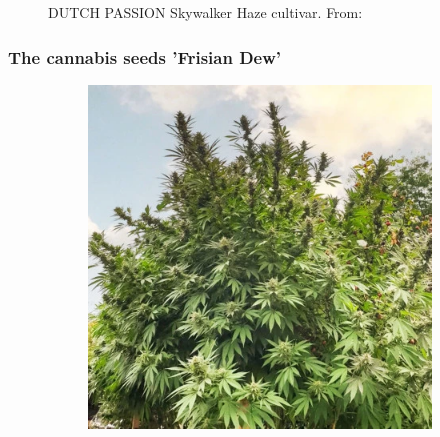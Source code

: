 \documentclass[12pt, aspectratio=1610]{beamer}
\begin{document}
\begin{frame}
\begin{figure}
\begin{subfigure}[t]{.48\textwidth}
            \end{subfigure}
            \caption{DUTCH PASSION Skywalker Haze cultivar. From: \textcite{noauthor_dutch-passion_skywalker-haze_nodate}}
        \end{figure}
    \end{frame}

    \begin{frame}
        \frametitle{The cannabis seeds 'Frisian Dew'}
        \begin{figure}
            \begin{subfigure}[t]{.48\textwidth}
                \includegraphics[width=\linewidth]{../lab_report/DUTCH-PASSION_Frisian-Dew_1}
            \end{subfigure}
            \hfill
            \begin{subfigure}[t]{.48\textwidth}

\end{subfigure}
\end{figure}
\end{frame}
\end{document}
